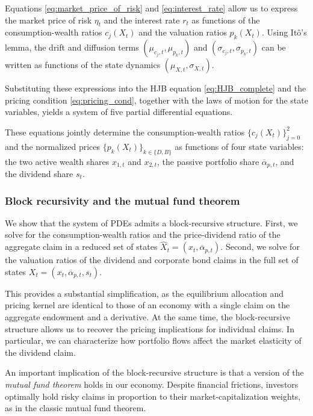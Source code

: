 \documentclass[12pt,english]{article}
\begin{document}
Equations \eqref{eq:market_price_of_risk} and \eqref{eq:interest_rate} allow us to express the market price of risk $\eta_t$ and the interest rate $r_t$ as functions of the consumption-wealth ratios $c_j(X_t)$ and the valuation ratios $p_k(X_t)$.
Using It\^{o}'s lemma, the drift and diffusion terms $(\mu_{c_j,t}, \mu_{p_k,t})$ and $(\sigma_{c_j,t}, \sigma_{p_k,t})$ can be written as functions of the state dynamics $(\mu_{X,t}, \sigma_{X,t})$.

Substituting these expressions into the HJB equation \eqref{eq:HJB_complete} and the pricing condition \eqref{eq:pricing_cond}, together with the laws of motion for the state variables, yields a system of five partial differential equations.

These equations jointly determine the consumption-wealth ratios $\{c_j(X_t)\}_{j=0}^2$ and the normalized prices $\{p_k(X_t)\}_{k \in \{D,B\}}$ as functions of four state variables:
the two active wealth shares $x_{1,t}$ and $x_{2,t}$, the passive portfolio share $\overline{\alpha}_{p,t}$, and the dividend share $s_t$.

\subsubsection{Block recursivity and the mutual fund theorem}\label{sec:pricing_claims}

We show that the system of PDEs admits a block-recursive structure.
First, we solve for the consumption-wealth ratios and the price-dividend ratio of the aggregate claim in a reduced set of states $\hat{X}_t = (x_{t}, \overline{\alpha}_{p,t})$.
Second, we solve for the valuation ratios of the dividend and corporate bond claims in the full set of states $X_t = (x_{t}, \overline{\alpha}_{p,t}, s_t)$.

This provides a substantial simplification, as the equilibrium allocation and pricing kernel are identical to those of an economy with a single claim on the aggregate endowment and a derivative.
At the same time, the block-recursive structure allows us to recover the pricing implications for individual claims.
In particular, we can characterize how portfolio flows affect the market elasticity of the dividend claim.

An important implication of the block-recursive structure is that a version of the \textit{mutual fund theorem} holds in our economy.
Despite financial frictions, investors optimally hold risky claims in proportion to their market-capitalization weights, as in the classic mutual fund theorem.
\end{document}
